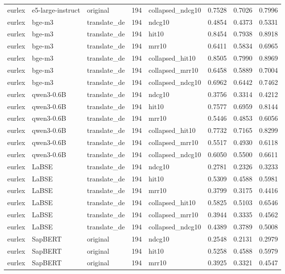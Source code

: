 \begin{tabular}{lllrlrrr}
eurlex & e5-large-instruct & original & 194 & collapsed\_ndcg10 & 0.7528 & 0.7026 & 0.7996 \\
eurlex & bge-m3 & translate\_de & 194 & ndcg10 & 0.4854 & 0.4373 & 0.5331 \\
eurlex & bge-m3 & translate\_de & 194 & hit10 & 0.8454 & 0.7938 & 0.8918 \\
eurlex & bge-m3 & translate\_de & 194 & mrr10 & 0.6411 & 0.5834 & 0.6965 \\
eurlex & bge-m3 & translate\_de & 194 & collapsed\_hit10 & 0.8505 & 0.7990 & 0.8969 \\
eurlex & bge-m3 & translate\_de & 194 & collapsed\_mrr10 & 0.6458 & 0.5889 & 0.7004 \\
eurlex & bge-m3 & translate\_de & 194 & collapsed\_ndcg10 & 0.6962 & 0.6442 & 0.7462 \\
eurlex & qwen3-0.6B & translate\_de & 194 & ndcg10 & 0.3756 & 0.3314 & 0.4212 \\
eurlex & qwen3-0.6B & translate\_de & 194 & hit10 & 0.7577 & 0.6959 & 0.8144 \\
eurlex & qwen3-0.6B & translate\_de & 194 & mrr10 & 0.5446 & 0.4853 & 0.6056 \\
eurlex & qwen3-0.6B & translate\_de & 194 & collapsed\_hit10 & 0.7732 & 0.7165 & 0.8299 \\
eurlex & qwen3-0.6B & translate\_de & 194 & collapsed\_mrr10 & 0.5517 & 0.4930 & 0.6118 \\
eurlex & qwen3-0.6B & translate\_de & 194 & collapsed\_ndcg10 & 0.6050 & 0.5500 & 0.6611 \\
eurlex & LaBSE & translate\_de & 194 & ndcg10 & 0.2781 & 0.2326 & 0.3233 \\
eurlex & LaBSE & translate\_de & 194 & hit10 & 0.5309 & 0.4588 & 0.5981 \\
eurlex & LaBSE & translate\_de & 194 & mrr10 & 0.3799 & 0.3175 & 0.4416 \\
eurlex & LaBSE & translate\_de & 194 & collapsed\_hit10 & 0.5825 & 0.5103 & 0.6546 \\
eurlex & LaBSE & translate\_de & 194 & collapsed\_mrr10 & 0.3944 & 0.3335 & 0.4562 \\
eurlex & LaBSE & translate\_de & 194 & collapsed\_ndcg10 & 0.4389 & 0.3789 & 0.5008 \\
eurlex & SapBERT & original & 194 & ndcg10 & 0.2548 & 0.2131 & 0.2979 \\
eurlex & SapBERT & original & 194 & hit10 & 0.5258 & 0.4588 & 0.5979 \\
eurlex & SapBERT & original & 194 & mrr10 & 0.3925 & 0.3321 & 0.4547 \\

\end{tabular}
